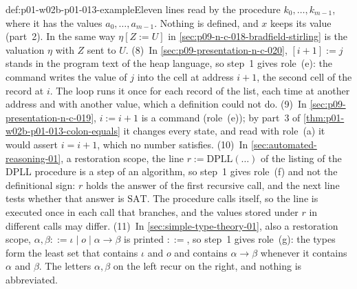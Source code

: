 \begin{hbexample}{def:p01-w02b-p01-013-example}{Eleven lines read by the procedure}
\(k_0,\ldots,k_{m-1}\), where it has the values \(a_0,\ldots,a_{m-1}\).
Nothing is defined, and \(x\) keeps its value (part~2).  In the same way
\(\eta[Z:=U]\) in \cref{sec:p09-n-c-018-bradfield-stirling} is the valuation
\(\eta\) with \(Z\) sent to \(U\).
(8)~In \cref{sec:p09-presentation-n-c-020}, \([i+1]:=j\) stands in the program
text of the heap language, so step~1 gives role~(e): the command writes the
value of \(j\) into the cell at address \(i+1\), the second cell of the
record at \(i\).  The loop runs it once for each record of the list, each
time at another address and with another value, which a definition could
not do.
(9)~In \cref{sec:p09-presentation-n-c-019}, \(i:=i+1\) is a command
(role~(e)); by part~3 of \cref{thm:p01-w02b-p01-013-colon-equals} it changes
every state, and read with role~(a) it would assert \(i=i+1\), which no
number satisfies.
(10)~In \cref{sec:automated-reasoning-01}, a restoration scope, the line
\(r:=\mathrm{DPLL}(\ldots)\) of the listing of the DPLL procedure is a step
of an algorithm, so step~1 gives role~(f) and not the definitional sign:
\(r\) holds the answer of the first recursive call, and the next line tests
whether that answer is \(\mathrm{SAT}\).  The procedure calls itself, so the
line is executed once in each call that branches, and the values stored
under \(r\) in different calls may differ.
(11)~In \cref{sec:simple-type-theory-01}, also a restoration scope,
\(\alpha,\beta::=\iota\mid o\mid\alpha\to\beta\) is printed \(::=\), so
step~1 gives role~(g): the types form the least set that contains
\(\iota\) and \(o\) and contains \(\alpha\to\beta\) whenever it contains
\(\alpha\) and \(\beta\).  The letters \(\alpha,\beta\) on the left recur on
the right, and nothing is abbreviated.
\end{hbexample}

